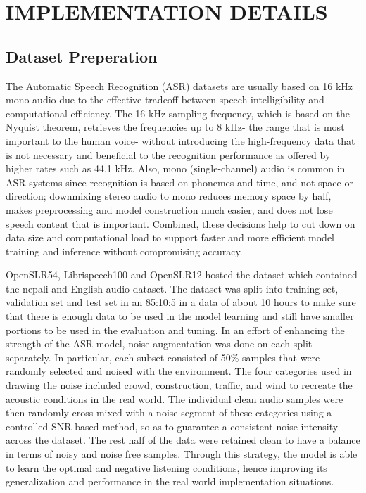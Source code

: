 \newpage
\section{\MakeUppercase{Implementation Details}}
\subsection{Dataset Preperation}
The Automatic Speech Recognition (ASR) datasets are usually based on 16 kHz mono audio due to the effective tradeoff between speech intelligibility and computational efficiency. The 16 kHz sampling frequency, which is based on the Nyquist theorem, retrieves the frequencies up to 8 kHz- the range that is most important to the human voice- without introducing the high-frequency data that is not necessary and beneficial to the recognition performance as offered by higher rates such as 44.1 kHz. Also, mono (single-channel) audio is common in ASR systems since recognition is based on phonemes and time, and not space or direction; downmixing stereo audio to mono reduces memory space by half, makes preprocessing and model construction much easier, and does not lose speech content that is important. Combined, these decisions help to cut down on data size and computational load to support faster and more efficient model training and inference without compromising accuracy.

OpenSLR54, Librispeech100 and OpenSLR12 hosted the dataset which contained the nepali and English audio dataset. The dataset was split into training set, validation set and test set in an 85:10:5 in a data of about 10 hours to make sure that there is enough data to be used in the model learning and still have smaller portions to be used in the evaluation and tuning. In an effort of enhancing the strength of the ASR model, noise augmentation was done on each split separately. In particular, each subset consisted of 50\% samples that were randomly selected and noised with the environment. The four categories used in drawing the noise included crowd, construction, traffic, and wind to recreate the acoustic conditions in the real world. The individual clean audio samples were then randomly cross-mixed with a noise segment of these categories using a controlled SNR-based method, so as to guarantee a consistent noise intensity across the dataset. The rest half of the data were retained clean to have a balance in terms of noisy and noise free samples. Through this strategy, the model is able to learn the optimal and negative listening conditions, hence improving its generalization and performance in the real world implementation situations.


